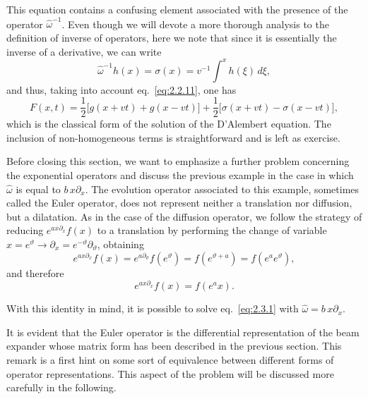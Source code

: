 This equation contains a confusing element associated with the presence of the operator $\hat{\omega}^{-1}$. Even though we will devote a more thorough analysis to the definition of inverse of operators, here we note that since it is essentially the inverse of a derivative, we can write
\begin{equation}
\hat{\omega}^{-1}h(x)=\sigma(x)=v^{-1}\int^{x}h(\xi)\,d\xi,
\label{eq:2.3.5}
\end{equation}
and thus, taking into account eq.~\eqref{eq:2.2.11}, one has
\begin{equation}
F(x,t)=\frac{1}{2}\bigl[g(x+v t)+g(x-v t)\bigr]
+\frac{1}{2}\bigl[\sigma(x+v t)-\sigma(x-v t)\bigr],
\label{eq:2.3.6}
\end{equation}
which is the classical form of the solution of the D'Alembert equation. The inclusion of non-homogeneous terms is straightforward and is left as exercise.

Before closing this section, we want to emphasize a further problem concerning the exponential operators and discuss the previous example in the case in which $\hat{\omega}$ is equal to $b\,x\partial_{x}$. The evolution operator associated to this example, sometimes called the Euler operator, does not represent neither a translation nor diffusion, but a dilatation. As in the case of the diffusion operator, we follow the strategy of reducing $e^{a x\partial_{x}}f(x)$ to a translation by performing the change of variable $x=e^{\vartheta}\rightarrow\partial_{x}=e^{-\vartheta}\partial_{\vartheta}$, obtaining
\begin{equation}
e^{a x\partial_{x}}f(x)=e^{a\partial_{\vartheta}}f(e^{\vartheta})
=f(e^{\vartheta+a})=f(e^{a}e^{\vartheta}),
\label{eq:2.3.7}
\end{equation}
and therefore
\begin{equation}
e^{a x\partial_{x}}f(x)=f(e^{a}x).
\label{eq:2.3.8}
\end{equation}

With this identity in mind, it is possible to solve eq.~\eqref{eq:2.3.1} with $\hat{\omega}=b\,x\partial_{x}$.

It is evident that the Euler operator is the differential representation of the beam expander whose matrix form has been described in the previous section. This remark is a first hint on some sort of equivalence between different forms of operator representations. This aspect of the problem will be discussed more carefully in the following.

